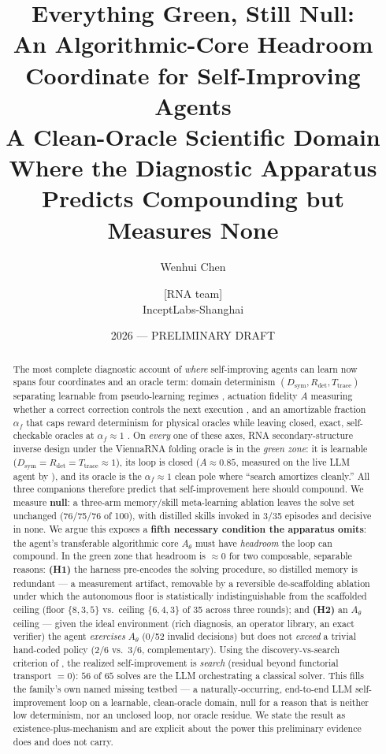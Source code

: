 \documentclass[11pt]{article}
\title{\textbf{Everything Green, Still Null:\\
An Algorithmic-Core Headroom Coordinate for Self-Improving Agents}\\[3pt]
\large A Clean-Oracle Scientific Domain Where the Diagnostic Apparatus\\
Predicts Compounding but Measures None}
\author{Wenhui Chen \and [RNA team]\\ InceptLabs-Shanghai}
\date{2026 --- PRELIMINARY DRAFT}
\newcommand{\Dsym}{D_{\mathrm{sym}}}
\newcommand{\Rdet}{R_{\mathrm{det}}}
\newcommand{\Ttrace}{T_{\mathrm{trace}}}
\newcommand{\Ath}{A_{\theta}}
\newcommand{\af}{\alpha_f}
\begin{document}
\maketitle

\begin{abstract}
The most complete diagnostic account of \emph{where} self-improving agents can learn now spans four
coordinates and an oracle term: domain determinism $(\Dsym,\Rdet,\Ttrace)$ separating learnable from
pseudo-learning regimes \citep{determinismmanifold}, actuation fidelity $A$ measuring whether a correct
correction controls the next execution \citep{actuation}, and an amortizable fraction $\af$ that caps
reward determinism for physical oracles while leaving closed, exact, self-checkable oracles at
$\af\!\approx\!1$ \citep{oracleresidue}. On \emph{every} one of these axes, RNA secondary-structure
inverse design under the ViennaRNA folding oracle is in the \emph{green zone}: it is learnable
($\Dsym\!=\!\Rdet\!=\!\Ttrace\!\approx\!1$), its loop is closed ($A\!\approx\!0.85$, measured on the
live LLM agent by \citealp{actuation}), and its oracle is the $\af\!\approx\!1$ clean pole where
``search amortizes cleanly.'' All three companions therefore predict that self-improvement here should
compound. We measure \textbf{null}: a three-arm memory/skill meta-learning ablation leaves the solve
set unchanged (76/75/76 of 100), with distilled skills invoked in 3/35 episodes and decisive in none.
We argue this exposes a \textbf{fifth necessary condition the apparatus omits}: the agent's transferable
algorithmic core $\Ath$ must have \emph{headroom} the loop can compound. In the green zone that headroom
is $\approx\!0$ for two composable, separable reasons: \textbf{(H1)} the harness pre-encodes the solving
procedure, so distilled memory is redundant --- a measurement artifact, removable by a reversible
de-scaffolding ablation under which the autonomous floor is statistically indistinguishable from the
scaffolded ceiling (floor $\{8,3,5\}$ vs.\ ceiling $\{6,4,3\}$ of 35 across three rounds); and
\textbf{(H2)} an $\Ath$ ceiling --- given the ideal environment (rich diagnosis, an operator library, an
exact verifier) the agent \emph{exercises} $\Ath$ (0/52 invalid decisions) but does not \emph{exceed} a
trivial hand-coded policy (2/6 vs.\ 3/6, complementary). Using the discovery-vs-search criterion of
\citet{wangbuehler2026}, the realized self-improvement is \emph{search} (residual beyond functorial
transport $=0$): $56$ of $65$ solves are the LLM orchestrating a classical solver. This fills the
family's own named missing testbed --- a naturally-occurring, end-to-end LLM self-improvement loop on a
learnable, clean-oracle domain, null for a reason that is neither low determinism, nor an unclosed loop,
nor oracle residue. We state the result as existence-plus-mechanism and are explicit about the power
this preliminary evidence does and does not carry.
\end{abstract}
\end{document}
